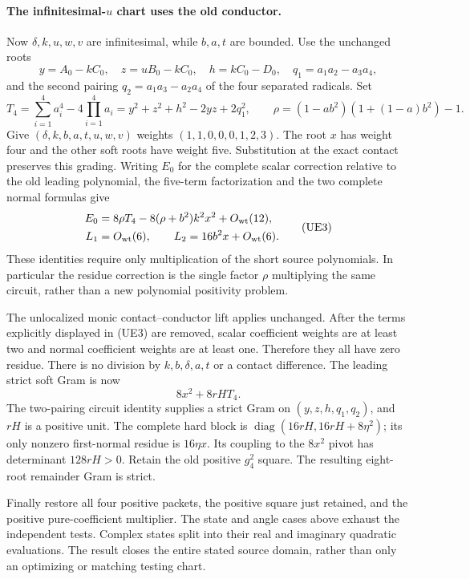 \paragraph{The infinitesimal-$u$ chart uses the old conductor.}
Now $\delta,k,u,w,v$ are infinitesimal, while $b,a,t$ are bounded.
Use the unchanged roots
\[
 y=A_0-kC_0,\quad z=uB_0-kC_0,\quad h=kC_0-D_0,
 \quad q_1=a_1a_2-a_3a_4,
\]
and the second pairing $q_2=a_1a_3-a_2a_4$ of the four separated
radicals. Set
\[
 T_4=\sum_{i=1}^4a_i^4-4\prod_{i=1}^4a_i
     =y^2+z^2+h^2-2yz+2q_1^2,
 \qquad \rho=(1-ab^2)(1+(1-a)b^2)-1.
\]
Give $(\delta,k,b,a,t,u,w,v)$ weights $(1,1,0,0,0,1,2,3)$.
The root $x$ has weight four and the other soft roots have weight
five. Substitution at the exact contact preserves this grading.
Writing $E_0$ for the complete scalar correction relative to the
old leading polynomial, the five-term factorization and the two
complete normal formulas give
\[
 \begin{aligned}
 E_0&=8\rho T_4-8(\rho+b^2)k^2x^2+O_{\rm wt}(12),\\
 L_1&=O_{\rm wt}(6),\qquad
 L_2=16b^2x+O_{\rm wt}(6).
 \end{aligned}\tag{UE3}
\]
These identities require only multiplication of the short source
polynomials. In particular the residue correction is the single
factor $\rho$ multiplying the same circuit, rather than a new
polynomial positivity problem.

The unlocalized monic contact--conductor lift applies unchanged.
After the terms explicitly displayed in (UE3) are removed, scalar
coefficient weights are at least two and normal coefficient weights
are at least one. Therefore they all have zero residue. There is no
division by $k,b,\delta,a,t$ or a contact difference. The leading
strict soft Gram is now
\[
                  8x^2+8rH T_4.
\]
The two-pairing circuit identity supplies a strict Gram on
$(y,z,h,q_1,q_2)$, and $rH$ is a positive unit. The complete hard
block is $\operatorname{diag}(16rH,16rH+8\eta^2)$; its only
nonzero first-normal residue is $16\eta x$. Its coupling to the
$8x^2$ pivot has determinant $128rH>0$. Retain the old positive
$g_4^2$ square. The resulting eight-root remainder Gram is strict.

Finally restore all four positive packets, the positive square just
retained, and the positive pure-coefficient multiplier. The state and
angle cases above exhaust the independent tests. Complex states split
into their real and imaginary quadratic evaluations. The result
closes the entire stated source domain, rather than only an optimizing
or matching testing chart.



